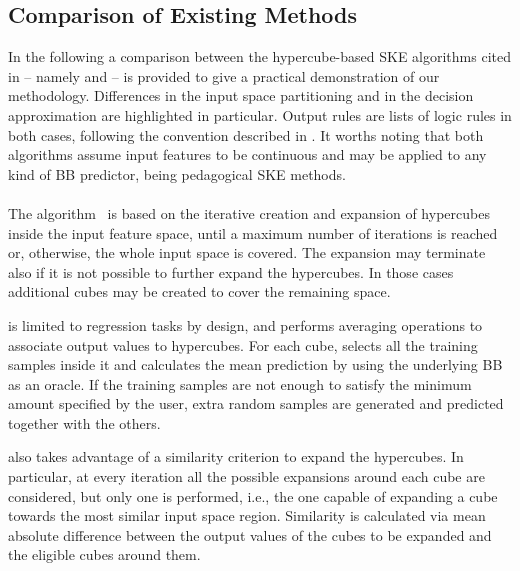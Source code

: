\documentclass[
]{ceurart}
\begin{document}
\subsection{Comparison of Existing Methods}

In the following a comparison between the hypercube-based SKE algorithms cited in  -- namely \iter{} and \gridex{} -- is provided to give a practical demonstration of our methodology.
%
Differences in the input space partitioning and in the decision approximation are highlighted in particular.
%
Output rules are lists of logic rules in both cases, following the convention described in .
%
It worths noting that both algorithms assume input features to be continuous and may be applied to any kind of BB predictor, being pedagogical SKE methods.

\paragraph{\iter}

The \iter{} algorithm~\cite{huysmans2006iter} is based on the iterative creation and expansion of hypercubes inside the input feature space, until a maximum number of iterations is reached or, otherwise, the whole input space is covered.
%
The expansion may terminate also if it is not possible to further expand the hypercubes.
%
In those cases additional cubes may be created to cover the remaining space.

\iter{} is limited to regression tasks by design, and performs averaging operations to associate output values to hypercubes.
%
For each cube, \iter{} selects all the training samples inside it and calculates the mean prediction by using the underlying BB as an oracle.
%
If the training samples are not enough to satisfy the minimum amount specified by the user, extra random samples are generated and predicted together with the others.

\iter{} also takes advantage of a similarity criterion to expand the hypercubes.
%
In particular, at every iteration all the possible expansions around each cube are considered, but only one is performed, i.e., the one capable of expanding a cube towards the most similar input space region.
%
Similarity is calculated via mean absolute difference between the output values of the cubes to be expanded and the eligible cubes around them.

\paragraph{\gridex{}}
\end{document}
